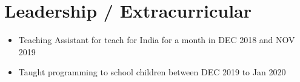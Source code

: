 \documentclass[letterpaper,10pt]{article}
\newcommand{\resumeItem}[1]{
  \item\small{
    {#1 \vspace{-2pt}}
  }
}
\newcommand{\resumeItemListStart}{\begin{itemize}}
\newcommand{\resumeItemListEnd}{\end{itemize}\vspace{-5pt}}
\begin{document}
\section{Leadership / Extracurricular}
            \resumeItemListStart
                \resumeItem{Teaching Assistant for teach for India for a month in DEC 2018 and NOV 2019}
                \resumeItem{Taught programming to school children between DEC 2019 to Jan 2020}
            \resumeItemListEnd
\end{document}
